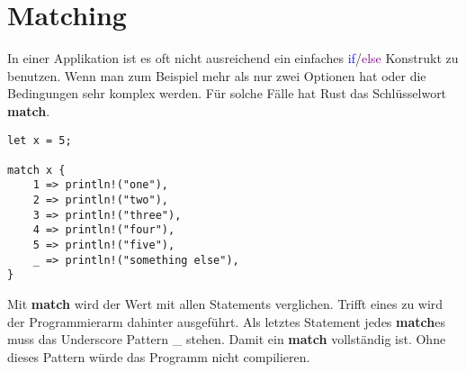 \section{Matching}
In einer Applikation ist es oft nicht ausreichend ein einfaches \textcolor{blue}{if}/\textcolor{purple}{else}
Konstrukt zu benutzen. Wenn man zum Beispiel mehr als nur zwei Optionen hat oder die Bedingungen sehr komplex werden. Für solche Fälle hat Rust das Schlüsselwort \textbf{match}.

\begin{lstlisting}
let x = 5;

match x {
    1 => println!("one"),
    2 => println!("two"),
    3 => println!("three"),
    4 => println!("four"),
    5 => println!("five"),
    _ => println!("something else"),
}
\end{lstlisting}
Mit \textbf{match} wird der Wert mit allen Statements verglichen. Trifft eines zu wird der Programmierarm dahinter ausgeführt. Als letztes Statement jedes \textbf{match}es muss das Underscore Pattern \_ stehen. Damit ein \textbf{match} vollständig ist. Ohne dieses Pattern würde das Programm nicht compilieren.